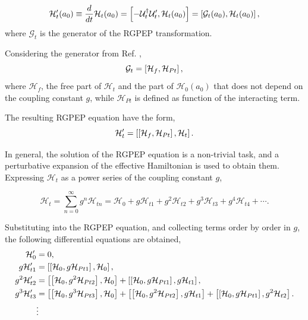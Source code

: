 \documentclass[11pt,a4paper,twoside,pdf]{article}
\numberwithin{equation}{section}
\begin{document}
\begin{equation}
    \mathcal{H}_t^\prime (a_0) \equiv \frac{d}{dt}\mathcal{H}_t(a_0) = 
    \left[ -\mathcal{U}_t^\dagger \mathcal{U}_t^\prime, \mathcal{H}_t(a_0) \right] 
    = \left[ \mathcal{G}_t(a_0), \mathcal{H}_t(a_0) \right],
\end{equation}
where $\mathcal{G}_t$ is the generator of the RGPEP transformation. 

Considering the generator from Ref. \cite{PEP},
\begin{equation}
    \mathcal{G}_t = \left[ \mathcal{H}_f, \mathcal{H}_{Pt} \right],
\end{equation}
where $\mathcal{H}_f$, the free part of $\mathcal{H}_t$ and the part of 
$\mathcal{H}_0(a_0)$ that does not depend on the coupling constant \( g \), 
while $\mathcal{H}_{Pt}$ is defined as function of the interacting term. 

The resulting RGPEP equation have the form,
\begin{equation}
    \mathcal{H}_t^\prime =  \left[ \left[ \mathcal{H}_f, \mathcal{H}_{Pt} \right], \mathcal{H}_t \right].
\end{equation}

In general, the solution of the RGPEP equation is a non-trivial task, and a perturbative
expansion of the effective Hamiltonian is used to obtain them. Expressing  
$\mathcal{H}_t$ as a power series of the coupling constant $g$,

\begin{equation}
    \mathcal{H}_t = \sum_{n=0}^{\infty} g^n \mathcal{H}_{t n} = 
    \mathcal{H}_{0} + g \mathcal{H}_{t 1} + g^2 \mathcal{H}_{t 2} + g^3 \mathcal{H}_{t 3} +
    g^4 \mathcal{H}_{t 4} + \cdots.
\end{equation}

Substituting into the RGPEP equation, and collecting terms order by order in \( g \),
the following differential equations are obtained,
\begin{align}
        \mathcal{H}_{0}^\prime &= 0, \label{eq:diff_order0}\\
        g\mathcal{H}_{t 1}^\prime &= \left[ \left[ \mathcal{H}_0, g\mathcal{H}_{Pt 1} \right], 
        \mathcal{H}_{0} \right], \label{eq:diff_order1}\\
        g^2\mathcal{H}_{t 2}^\prime &= \left[ \left[ \mathcal{H}_0, g^2\mathcal{H}_{Pt 2} \right], 
        \mathcal{H}_{0} \right] + \left[ \left[ \mathcal{H}_0, g\mathcal{H}_{Pt 1} \right], 
        g\mathcal{H}_{t 1} \right], \\
        g^3\mathcal{H}_{t 3}^\prime &= \left[ \left[ \mathcal{H}_0, g^3\mathcal{H}_{Pt 3} \right], 
        \mathcal{H}_{0} \right] + \left[ \left[ \mathcal{H}_0, g^2\mathcal{H}_{Pt 2} \right], 
        g\mathcal{H}_{t 1} \right] + \left[ \left[ \mathcal{H}_0, g\mathcal{H}_{Pt 1} \right], 
        g^2\mathcal{H}_{t 2} \right]. \label{eq:diff_order3}\\
        &\vdots \nonumber
\end{align}
\end{document}
